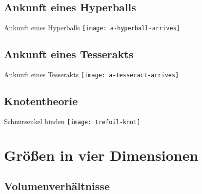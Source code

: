 \documentclass[12pt,compress,ngerman,utf8,t]{beamer}
\begin{document}
\subsection{Ankunft eines Hyperballs}

\begin{frame}{Ankunft eines Hyperballs}
  \centering
  \texttt{[image: a-hyperball-arrives]}
  \par
\end{frame}


\subsection[und eines Tesserakts]{Ankunft eines Tesserakts}

\begin{frame}{Ankunft eines Tesserakts}
  \centering
  \texttt{[image: a-tesseract-arrives]}
  \par
\end{frame}



\subsection{Knotentheorie}

\begin{frame}{Schnürsenkel binden}
  \centering
  \texttt{[image: trefoil-knot]}
  \par
\end{frame}

%
%


\section[Größen]{Größen in vier Dimensionen}

\subsection{Volumenverhältnisse}
\end{document}
